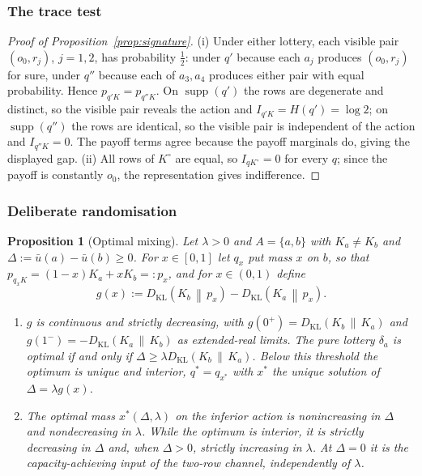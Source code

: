 \documentclass[11pt,a4paper]{article}
\newtheorem{proposition}[theorem]{Proposition}
\theoremstyle{definition}
\newcommand{\I}{I}
\newcommand{\Sh}{H}
\newcommand{\supp}{\operatorname{supp}}
\newcommand{\KL}{D_{\mathrm{KL}}}
\newcommand{\1}{\mathbf 1}
\begin{document}
\subsubsection{The trace test}\label{app:trace-test-proof}

\begin{proof}[Proof of Proposition~\ref{prop:signature}]
(i) Under either lottery, each visible pair $(o_0,r_j)$, $j=1,2$, has probability $\tfrac12$: under $q'$ because
each $a_j$ produces $(o_0,r_j)$ for sure, under $q''$ because each of $a_3,a_4$ produces either pair with equal
probability.  Hence $p_{q'K}=p_{q''K}$.  On $\supp(q')$ the rows are degenerate and distinct, so the visible pair
reveals the action and $\I_{q'K}=\Sh(q')=\log2$; on $\supp(q'')$ the rows are identical, so the visible pair is
independent of the action and $\I_{q''K}=0$.  The payoff terms agree because the payoff marginals do, giving the
displayed gap.
(ii) All rows of $K^\circ$ are equal, so $\I_{qK^\circ}=0$ for every $q$; since the payoff is constantly $o_0$,
the representation gives indifference.
\end{proof}

\subsubsection{Deliberate randomisation}
\label{app:randomisation-proofs}

\begin{proposition}[Optimal mixing]\label{prop:binary}
Let $\lambda>0$ and $A=\{a,b\}$ with $K_a\ne K_b$ and
$\Delta:=\bar u(a)-\bar u(b)\ge0$.  For $x\in[0,1]$ let $q_x$ put mass $x$ on $b$, so that
$p_{q_xK}=(1-x)K_a+xK_b=:p_x$, and for $x\in(0,1)$ define
\[
 g(x):=\KL\!\left(K_b\,\middle\|\,p_x\right)-\KL\!\left(K_a\,\middle\|\,p_x\right).
\]
\begin{enumerate}[label=\textup{(\roman*)},leftmargin=*]
\item $g$ is continuous and strictly decreasing, with
$g(0^+)=\KL(K_b\,\|\,K_a)$ and
$g(1^-)=-\KL(K_a\,\|\,K_b)$ as extended-real limits.  The pure lottery $\delta_a$ is optimal if and only if
$\Delta\ge\lambda\KL(K_b\,\|\,K_a)$.  Below this threshold the optimum is unique and interior,
$q^*=q_{x^*}$ with $x^*$ the unique solution of $\Delta=\lambda g(x)$.
\item The optimal mass $x^*(\Delta,\lambda)$ on the inferior action is nonincreasing in $\Delta$ and
nondecreasing in $\lambda$.  While the optimum is interior, it is strictly decreasing in $\Delta$ and,
when $\Delta>0$, strictly increasing in $\lambda$.  At $\Delta=0$ it is the capacity-achieving input
of the two-row channel, independently of $\lambda$.
\end{enumerate}
\end{proposition}
\end{document}
